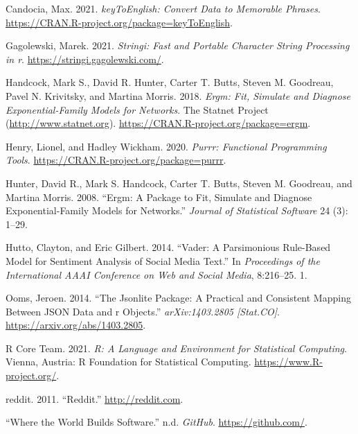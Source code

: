 \documentclass[
]{article}
\newlength{\cslhangindent}
\newlength{\cslentryspacingunit} %
\newenvironment{CSLReferences}[2] %
 {%
  \setlength{\parindent}{0pt}
  \ifodd #1
  \let\oldpar\par
  \def\par{\hangindent=\cslhangindent\oldpar}
  \fi
  \setlength{\parskip}{#2\cslentryspacingunit}
 }%
 {}
\begin{document}
\hypertarget{refs}{}
\begin{CSLReferences}{1}{0}
\leavevmode{}%
Candocia, Max. 2021. \emph{keyToEnglish: Convert Data to Memorable Phrases}. \url{https://CRAN.R-project.org/package=keyToEnglish}.

\leavevmode{}%
Gagolewski, Marek. 2021. \emph{Stringi: Fast and Portable Character String Processing in r}. \url{https://stringi.gagolewski.com/}.

\leavevmode{}%
Handcock, Mark S., David R. Hunter, Carter T. Butts, Steven M. Goodreau, Pavel N. Krivitsky, and Martina Morris. 2018. \emph{Ergm: Fit, Simulate and Diagnose Exponential-Family Models for Networks}. The Statnet Project (\url{http://www.statnet.org}). \url{https://CRAN.R-project.org/package=ergm}.

\leavevmode{}%
Henry, Lionel, and Hadley Wickham. 2020. \emph{Purrr: Functional Programming Tools}. \url{https://CRAN.R-project.org/package=purrr}.

\leavevmode{}%
Hunter, David R., Mark S. Handcock, Carter T. Butts, Steven M. Goodreau, and Martina Morris. 2008. {``Ergm: A Package to Fit, Simulate and Diagnose Exponential-Family Models for Networks.''} \emph{Journal of Statistical Software} 24 (3): 1--29.

\leavevmode{}%
Hutto, Clayton, and Eric Gilbert. 2014. {``Vader: A Parsimonious Rule-Based Model for Sentiment Analysis of Social Media Text.''} In \emph{Proceedings of the International AAAI Conference on Web and Social Media}, 8:216--25. 1.

\leavevmode{}%
Ooms, Jeroen. 2014. {``The Jsonlite Package: A Practical and Consistent Mapping Between JSON Data and r Objects.''} \emph{arXiv:1403.2805 {[}Stat.CO{]}}. \url{https://arxiv.org/abs/1403.2805}.

\leavevmode{}%
R Core Team. 2021. \emph{R: A Language and Environment for Statistical Computing}. Vienna, Austria: R Foundation for Statistical Computing. \url{https://www.R-project.org/}.

\leavevmode{}%
reddit. 2011. {``Reddit.''} \url{http://reddit.com}.

\leavevmode{}%
{``Where the World Builds Software.''} n.d. \emph{GitHub}. \url{https://github.com/}.


\end{CSLReferences}
\end{document}
